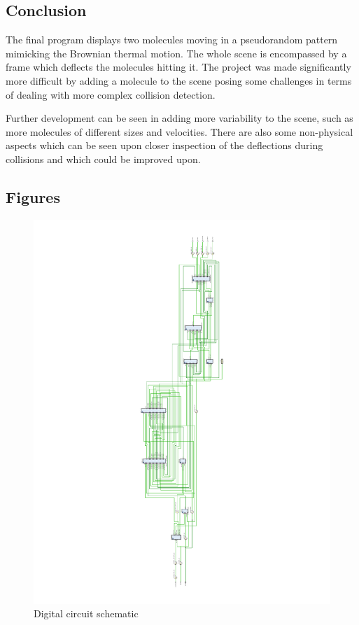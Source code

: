 \documentclass[11pt,a4paper]{article}
\begin{document}
    \subsection*{Conclusion}
        The final program displays two molecules moving in a pseudorandom pattern mimicking the Brownian thermal motion. The whole scene is encompassed by a frame which deflects the molecules hitting it. The project was made significantly more difficult by adding a molecule to the scene posing some challenges in terms of dealing with more complex collision detection.

        Further development can be seen in adding more variability to the scene, such as more molecules of different sizes and velocities. There are also some non-physical aspects which can be seen upon closer inspection of the deflections during collisions and which could be improved upon.




\newpage
    \subsection*{Figures}

    \begin{figure}[!ht]
        \centering
        \includegraphics[width=\textwidth]{src/schematic.pdf}
        \caption{\label{fig:schematic}Digital circuit schematic}
    \end{figure}
\end{document}
